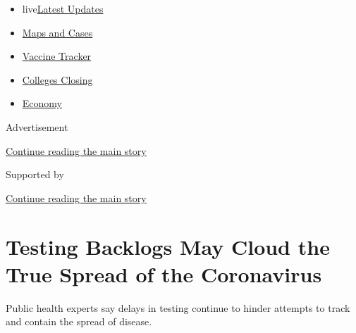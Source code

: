 \begin{itemize}
\tightlist
\item
  live\href{https://www.nytimes3xbfgragh.onion/2020/08/20/world/coronavirus-covid.html?name=styln-coronavirus-national\&region=TOP_BANNER\&variant=undefined\&block=storyline_menu_recirc\&action=click\&pgtype=Article\&impression_id=036da970-e387-11ea-8c8a-b7fbae24c18c}{Latest
  Updates}
\item
  \href{https://www.nytimes3xbfgragh.onion/interactive/2020/us/coronavirus-us-cases.html?name=styln-coronavirus-national\&region=TOP_BANNER\&variant=undefined\&block=storyline_menu_recirc\&action=click\&pgtype=Article\&impression_id=036da971-e387-11ea-8c8a-b7fbae24c18c}{Maps
  and Cases}
\item
  \href{https://www.nytimes3xbfgragh.onion/interactive/2020/science/coronavirus-vaccine-tracker.html?name=styln-coronavirus-national\&region=TOP_BANNER\&variant=undefined\&block=storyline_menu_recirc\&action=click\&pgtype=Article\&impression_id=036da972-e387-11ea-8c8a-b7fbae24c18c}{Vaccine
  Tracker}
\item
  \href{https://www.nytimes3xbfgragh.onion/2020/08/19/us/colleges-closing-covid.html?name=styln-coronavirus-national\&region=TOP_BANNER\&variant=undefined\&block=storyline_menu_recirc\&action=click\&pgtype=Article\&impression_id=036da973-e387-11ea-8c8a-b7fbae24c18c}{Colleges
  Closing}
\item
  \href{https://www.nytimes3xbfgragh.onion/live/2020/08/20/business/stock-market-today-coronavirus?name=styln-coronavirus-national\&region=TOP_BANNER\&variant=undefined\&block=storyline_menu_recirc\&action=click\&pgtype=Article\&impression_id=036da974-e387-11ea-8c8a-b7fbae24c18c}{Economy}
\end{itemize}

Advertisement

\protect\hyperlink{after-top}{Continue reading the main story}

Supported by

\protect\hyperlink{after-sponsor}{Continue reading the main story}

\hypertarget{testing-backlogs-may-cloud-the-true-spread-of-the-coronavirus}{%
\section{Testing Backlogs May Cloud the True Spread of the
Coronavirus}\label{testing-backlogs-may-cloud-the-true-spread-of-the-coronavirus}}

Public health experts say delays in testing continue to hinder attempts
to track and contain the spread of disease.

